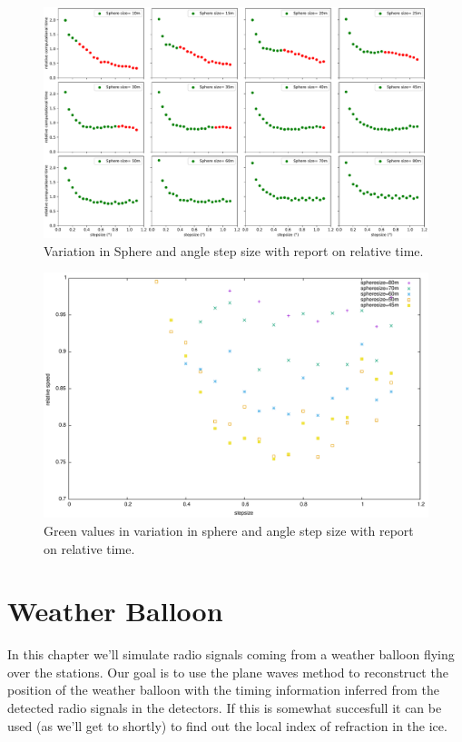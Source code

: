 \documentclass[11pt,a4paper,faculty=we,language=en,doctype=report]{cls/ugent-doc}
\begin{document}
\begin{figure}
	\includegraphics[width=\textwidth]{figures/subplotofallstepsphere.pdf}
	\caption{Variation in Sphere and angle step size with report on relative time.}
	\label{fig:SphereStepInfl}
\end{figure}

\begin{figure}
	\includegraphics[width=\textwidth]{figures/SphereAndStepFinal.pdf}
	\caption{Green values in variation in sphere and angle step size with report on relative time.}
	\label{fig:SphereStepFinal}
\end{figure}

\chapter{Weather Balloon}
In this chapter we'll simulate radio signals coming from a weather
balloon flying over the stations. Our goal is to use the plane waves 
method to reconstruct the position of the weather balloon with the
timing information inferred from the detected radio signals in the
detectors.
If this is somewhat succesfull it can be used (as we'll get to
shortly) to find out the local index of refraction in the ice.
\end{document}
